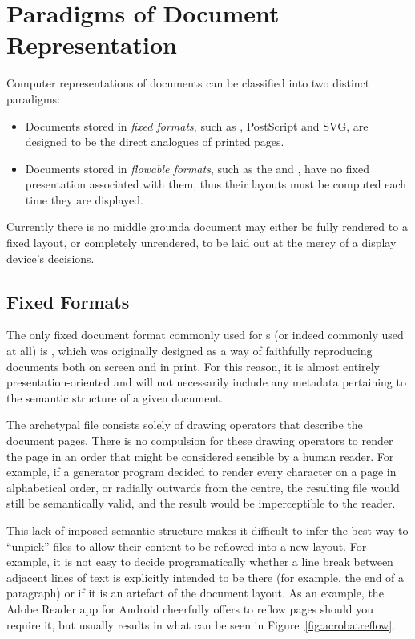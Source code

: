 \section{Paradigms of Document Representation}
Computer representations of documents can be classified into two distinct paradigms:
\begin{itemize}
 \item Documents stored in \emph{fixed formats}, such as \pdf{}, PostScript and \textsc{SVG}, are designed to be the direct analogues of printed pages.
 \item Documents stored in \emph{flowable formats}, such as the \html{} and \epub{}, have no fixed presentation associated with them, thus their layouts must be computed each time they are displayed.
\end{itemize}
Currently there is no middle ground\ed a document may either be fully rendered to a fixed layout, or completely unrendered, to be laid out at the mercy of a display device's decisions.

\subsection{Fixed Formats}
\label{sec:fixedformats}
The only fixed document format commonly used for \ebook{}s (or indeed commonly used at all) is \pdf{}, which was originally designed as a way of faithfully reproducing documents both on screen and in print.\hspace{0pt}\cite{Warnock1991} For this reason, it is almost entirely pre\-s\-en\-ta\-tion-oriented and will not necessarily include any metadata pertaining to the semantic structure of a given document.

The archetypal \pdf{} file consists solely of drawing operators that describe the document pages. There is no compulsion for these drawing operators to render the page in an order that might be considered sensible by a human reader. For example, if a \pdf{} generator program decided to render every character on a page in alphabetical order, or radially outwards from the centre, the resulting file would still be semantically valid, and the result would be imperceptible to the reader.

This lack of imposed semantic structure makes it difficult to infer the best way to ``unpick'' \pdf{} files to allow their content to be reflowed into a new layout.\hspace{0pt}\cite{Lovegrove1995, Bagley2005} For example, it is not easy to decide programatically whether a line break between adjacent lines of text is explicitly intended to be there (for example, the end of a paragraph) or if it is an artefact of the document layout. As an example, the Adobe Reader app for Android cheerfully offers to reflow \pdf{} pages should you require it, but usually results in what can be seen in Figure~\ref{fig:acrobatreflow}.

